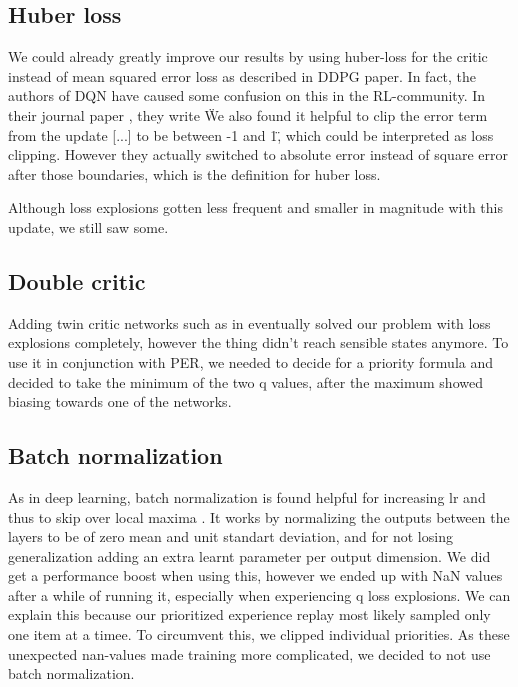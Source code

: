 \documentclass[hyperref,german,beleg]{cgvpub}
\begin{document}
\subsection{Huber loss}
We could already greatly improve our results by using huber-loss \cite{huber1964} for the critic instead of mean squared error loss as described in DDPG paper. In fact, the authors of \ac{DQN} have caused some confusion on this in the \ac{RL}-community. In their journal paper \cite{mnihHumanlevelControlDeep2015}, they write \"We also found it helpful to clip the error term from the update [...] to be between -1 and 1\", which could be interpreted as loss clipping. However they actually switched to absolute error instead of square error after those boundaries, which is the definition for huber loss.

Although loss explosions gotten less frequent and smaller in magnitude with this update, we still saw some.

\subsection{Double critic}
Adding twin critic networks such as in \cite{fujimotoAddressingFunctionApproximation2018} eventually solved our problem with loss explosions completely, however the thing didn't reach sensible states anymore. To use it in conjunction with \ac{PER}, we needed to decide for a priority formula and decided to take the minimum of the two q values, after the maximum showed biasing towards one of the networks. 

\subsection{Batch normalization}
As in deep learning, batch normalization is found helpful for increasing lr and thus to skip over local maxima \cite{bjorckUnderstandingBatchNormalization}. It works by normalizing the outputs between the layers to be of zero mean and unit standart deviation, and for not losing generalization adding an extra learnt parameter per output dimension. We did get a performance boost when using this, however we ended up with NaN values after a while of running it, especially when experiencing q loss explosions. We can explain this because our prioritized experience replay most likely sampled only one item at a timee. To circumvent this, we clipped individual priorities. As these unexpected nan-values made training more complicated, we decided to not use batch normalization.
\end{document}
